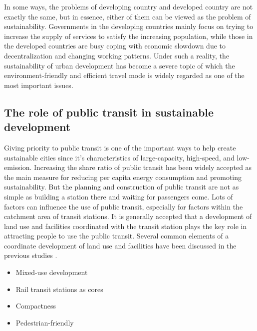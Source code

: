 In some ways, the problems of developing country and developed country are not exactly the same, but in essence, either of them can be viewed as the problem of sustainability. Governments in the developing countries mainly focus on trying to increase the supply of services to satisfy the increasing population, while those in the developed countries are busy coping with economic slowdown due to decentralization and changing working patterns. Under such a reality, the sustainability of urban development has become a severe topic of which the environment-friendly and efficient travel mode is widely regarded as one of the most important issues.

\subsection{The role of public transit in sustainable development}
Giving priority to public transit is one of the important ways to help create sustainable cities since it's characteristics of large-capacity, high-speed, and low-emission. Increasing the share ratio of public transit has been widely accepted as the main measure for reducing per capita energy consumption and promoting sustainability. But the planning and construction of public transit are not as simple as building a station there and waiting for passengers come. Lots of factors can influence the use of public transit, especially for factors within the catchment area of transit stations. It is generally accepted that a development of land use and facilities coordinated with the transit station plays the key role in attracting people to use the public transit. Several common elements of a coordinate development of land use and facilities have been discussed in the previous studies \cite{boarnet1997story,bernick1997transit,megally2001california,cervero2004transit}.

\begin{itemize}
	\setlength{\parskip}{0\baselineskip} %
	\item Mixed-use development
	\item Rail transit stations as cores
	\item Compactness
	\item Pedestrian-friendly
	\setlength{\parskip}{0.7\baselineskip} %
\end{itemize}

